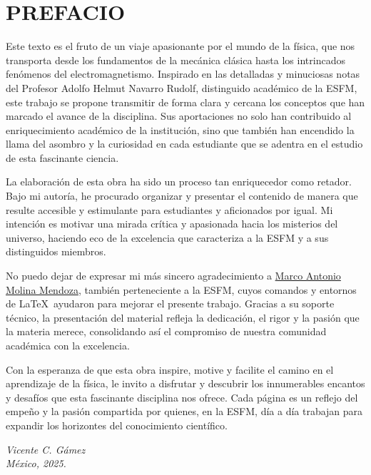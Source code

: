 \chapter*{PREFACIO}

Este texto es el fruto de un viaje apasionante por el mundo de la física, que nos transporta desde los fundamentos de la mecánica clásica hasta los intrincados fenómenos del electromagnetismo. Inspirado en las detalladas y minuciosas notas del Profesor Adolfo Helmut Navarro Rudolf, distinguido académico de la ESFM, este trabajo se propone transmitir de forma clara y cercana los conceptos que han marcado el avance de la disciplina. Sus aportaciones no solo han contribuido al enriquecimiento académico de la institución, sino que también han encendido la llama del asombro y la curiosidad en cada estudiante que se adentra en el estudio de esta fascinante ciencia.

La elaboración de esta obra ha sido un proceso tan enriquecedor como retador. Bajo mi autoría, he procurado organizar y presentar el contenido de manera que resulte accesible y estimulante para estudiantes y aficionados por igual. Mi intención es motivar una mirada crítica y apasionada hacia los misterios del universo, haciendo eco de la excelencia que caracteriza a la ESFM y a sus distinguidos miembros.

No puedo dejar de expresar mi más sincero agradecimiento a \href{https://github.com/antobno}{\color{mainc}Marco Antonio Molina Mendoza}, también perteneciente a la ESFM, cuyos comandos y entornos de \LaTeX\ ayudaron para mejorar el presente trabajo. Gracias a su soporte técnico, la presentación del material refleja la dedicación, el rigor y la pasión que la materia merece, consolidando así el compromiso de nuestra comunidad académica con la excelencia.

Con la esperanza de que esta obra inspire, motive y facilite el camino en el aprendizaje de la física, le invito a disfrutar y descubrir los innumerables encantos y desafíos que esta fascinante disciplina nos ofrece. Cada página es un reflejo del empeño y la pasión compartida por quienes, en la ESFM, día a día trabajan para expandir los horizontes del conocimiento científico.%

\vspace{2ex}

\begin{flushright}
    \cafe\selectfont\itshape Vicente C. Gámez \\
    México, 2025.
\end{flushright}